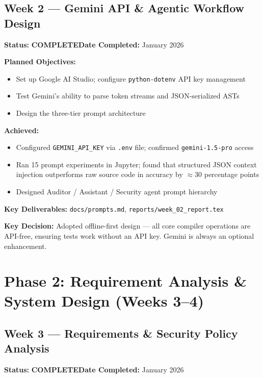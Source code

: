 \documentclass[a4paper,11pt]{article}
\newcommand{\done}{\colorbox{green!25}{\textbf{\small COMPLETE}}}
\begin{document}
\subsection{Week 2 --- Gemini API \& Agentic Workflow Design}

\textbf{Status:} \done \hfill \textbf{Date Completed:} January 2026

\textbf{Planned Objectives:}
\begin{itemize}[leftmargin=*, itemsep=1pt]
    \item Set up Google AI Studio; configure \texttt{python-dotenv} API key management
    \item Test Gemini's ability to parse token streams and JSON-serialized ASTs
    \item Design the three-tier prompt architecture
\end{itemize}

\textbf{Achieved:}
\begin{itemize}[leftmargin=*, itemsep=1pt]
    \item Configured \texttt{GEMINI\_API\_KEY} via \texttt{.env} file; confirmed \texttt{gemini-1.5-pro} access
    \item Ran 15 prompt experiments in Jupyter; found that structured JSON context injection outperforms raw source code in accuracy by $\approx$30 percentage points
    \item Designed Auditor / Assistant / Security agent prompt hierarchy
\end{itemize}

\textbf{Key Deliverables:} \texttt{docs/prompts.md}, \texttt{reports/week\_02\_report.tex}

\textbf{Key Decision:} Adopted offline-first design --- all core compiler operations are API-free, ensuring tests work without an API key. Gemini is always an optional enhancement.

\section{Phase 2: Requirement Analysis \& System Design (Weeks 3--4)}

\subsection{Week 3 --- Requirements \& Security Policy Analysis}

\textbf{Status:} \done \hfill \textbf{Date Completed:} January 2026
\end{document}
